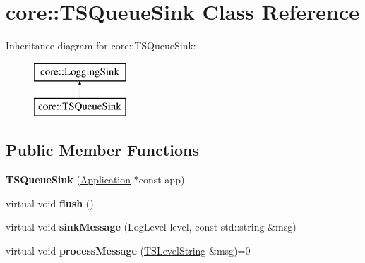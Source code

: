 \hypertarget{classcore_1_1_t_s_queue_sink}{\section{core\-:\-:T\-S\-Queue\-Sink Class Reference}
\label{classcore_1_1_t_s_queue_sink}
}
Inheritance diagram for core\-:\-:T\-S\-Queue\-Sink\-:\begin{figure}[H]
\begin{center}
\leavevmode
\includegraphics[height=2.000000cm]{classcore_1_1_t_s_queue_sink}
\end{center}
\end{figure}
\subsection*{Public Member Functions}
\begin{DoxyCompactItemize}
\item 
\hypertarget{classcore_1_1_t_s_queue_sink_ae8635c750aac7eba3a03bda390f1d045}{{\bfseries T\-S\-Queue\-Sink} (\hyperlink{classcore_1_1_application}{Application} $\ast$const app)}\label{classcore_1_1_t_s_queue_sink_ae8635c750aac7eba3a03bda390f1d045}

\item 
\hypertarget{classcore_1_1_t_s_queue_sink_ae543de8d1f63b6bcbfe7b7f368d91115}{virtual void {\bfseries flush} ()}\label{classcore_1_1_t_s_queue_sink_ae543de8d1f63b6bcbfe7b7f368d91115}

\item 
\hypertarget{classcore_1_1_t_s_queue_sink_a86429bd7258c4b67faae7773bf3a24d6}{virtual void {\bfseries sink\-Message} (Log\-Level level, const std\-::string \&msg)}\label{classcore_1_1_t_s_queue_sink_a86429bd7258c4b67faae7773bf3a24d6}

\item 
\hypertarget{classcore_1_1_t_s_queue_sink_a3344aaed4c3fc48795900ac3adfa1073}{virtual void {\bfseries process\-Message} (\hyperlink{classcore_1_1_timestamped_level_message}{T\-S\-Level\-String} \&msg)=0}\label{classcore_1_1_t_s_queue_sink_a3344aaed4c3fc48795900ac3adfa1073}

\end{DoxyCompactItemize}

